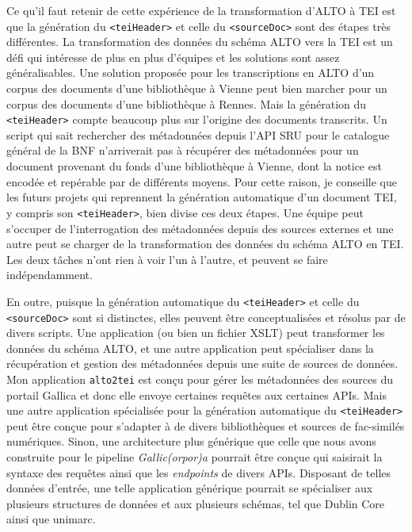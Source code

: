 \documentclass[class=article, crop=false]{standalone}
\begin{document}
Ce qu'il faut retenir de cette expérience de la transformation d'\acrshort{ALTO} à \acrshort{TEI} est que la génération du \texttt{<teiHeader>} et celle du \texttt{<sourceDoc>} sont des étapes très différentes. La transformation des données du schéma \acrshort{ALTO} vers la \acrshort{TEI} est un défi qui intéresse de plus en plus d'équipes et les solutions sont assez généralisables. Une solution proposée pour les transcriptions en \acrshort{ALTO} d'un corpus des documents d'une bibliothèque à Vienne peut bien marcher pour un corpus des documents d'une bibliothèque à Rennes. Mais la génération du \texttt{<teiHeader>} compte beaucoup plus sur l'origine des documents transcrits. Un script qui sait rechercher des métadonnées depuis l'\acrshort{API} \acrshort{SRU} pour le catalogue général de la \acrlong{BNF} n'arriverait pas à récupérer des métadonnées pour un document provenant du fonds d'une bibliothèque à Vienne, dont la notice est encodée et repérable par de différents moyens. Pour cette raison, je conseille que les futurs projets qui reprennent la génération automatique d'un document \acrshort{TEI}, y compris son \texttt{<teiHeader>}, bien divise ces deux étapes. Une équipe peut s'occuper de l'interrogation des métadonnées depuis des sources externes et une autre peut se charger de la transformation des données du schéma \acrshort{ALTO} en \acrshort{TEI}. Les deux tâches n'ont rien à voir l'un à l'autre, et peuvent se faire indépendamment.

En outre, puisque la génération automatique du \texttt{<teiHeader>} et celle du \texttt{<sourceDoc>} sont si distinctes, elles peuvent être conceptualisées et résolus par de divers scripts. Une application (ou bien un fichier XSLT) peut transformer les données du schéma \acrshort{ALTO}, et une autre application peut spécialiser dans la récupération et gestion des métadonnées depuis une suite de sources de données. Mon application \texttt{alto2tei} est conçu pour gérer les métadonnées des sources du portail Gallica et donc elle envoye certaines requêtes aux certaines \acrshort{API}s. Mais une autre application spécialisée pour la génération automatique du \texttt{<teiHeader>} peut être conçue pour s'adapter à de divers bibliothèques et sources de fac-similés numériques. Sinon, une architecture plus générique que celle que nous avons construite pour le pipeline \textit{Gallic(orpor)a} pourrait être conçue qui saisirait la syntaxe des requêtes ainsi que les \textit{endpoints} de divers \acrshort{API}s. Disposant de telles données d'entrée, une telle application générique pourrait se spécialiser aux plusieurs structures de données et aux plusieurs schémas, tel que Dublin Core ainsi que \Gls{unimarc}.
\end{document}
